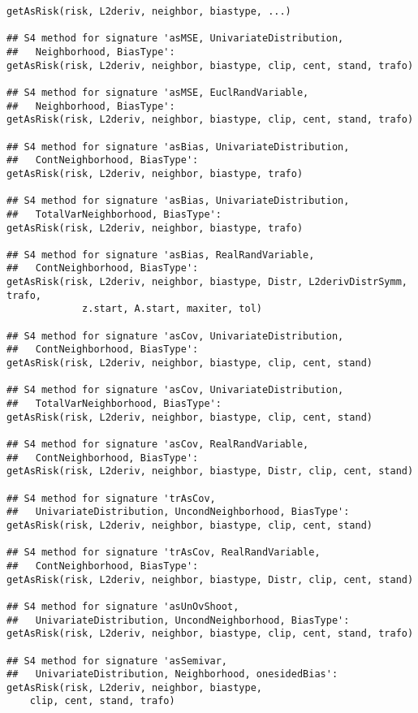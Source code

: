 \begin{Usage}
\begin{verbatim}
getAsRisk(risk, L2deriv, neighbor, biastype, ...)

## S4 method for signature 'asMSE, UnivariateDistribution,
##   Neighborhood, BiasType':
getAsRisk(risk, L2deriv, neighbor, biastype, clip, cent, stand, trafo)

## S4 method for signature 'asMSE, EuclRandVariable,
##   Neighborhood, BiasType':
getAsRisk(risk, L2deriv, neighbor, biastype, clip, cent, stand, trafo)

## S4 method for signature 'asBias, UnivariateDistribution,
##   ContNeighborhood, BiasType':
getAsRisk(risk, L2deriv, neighbor, biastype, trafo)

## S4 method for signature 'asBias, UnivariateDistribution,
##   TotalVarNeighborhood, BiasType':
getAsRisk(risk, L2deriv, neighbor, biastype, trafo)

## S4 method for signature 'asBias, RealRandVariable,
##   ContNeighborhood, BiasType':
getAsRisk(risk, L2deriv, neighbor, biastype, Distr, L2derivDistrSymm, trafo, 
             z.start, A.start, maxiter, tol)

## S4 method for signature 'asCov, UnivariateDistribution,
##   ContNeighborhood, BiasType':
getAsRisk(risk, L2deriv, neighbor, biastype, clip, cent, stand)

## S4 method for signature 'asCov, UnivariateDistribution,
##   TotalVarNeighborhood, BiasType':
getAsRisk(risk, L2deriv, neighbor, biastype, clip, cent, stand)

## S4 method for signature 'asCov, RealRandVariable,
##   ContNeighborhood, BiasType':
getAsRisk(risk, L2deriv, neighbor, biastype, Distr, clip, cent, stand)

## S4 method for signature 'trAsCov,
##   UnivariateDistribution, UncondNeighborhood, BiasType':
getAsRisk(risk, L2deriv, neighbor, biastype, clip, cent, stand)

## S4 method for signature 'trAsCov, RealRandVariable,
##   ContNeighborhood, BiasType':
getAsRisk(risk, L2deriv, neighbor, biastype, Distr, clip, cent, stand)

## S4 method for signature 'asUnOvShoot,
##   UnivariateDistribution, UncondNeighborhood, BiasType':
getAsRisk(risk, L2deriv, neighbor, biastype, clip, cent, stand, trafo)

## S4 method for signature 'asSemivar,
##   UnivariateDistribution, Neighborhood, onesidedBias':
getAsRisk(risk, L2deriv, neighbor, biastype, 
    clip, cent, stand, trafo)
\end{verbatim}
\end{Usage}
